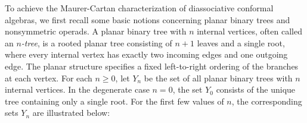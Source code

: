 \documentclass[a4paper,reqno,10pt]{amsart}
\theoremstyle{plain}
\theoremstyle{definition}
\theoremstyle{remark}
\begin{document}
\medskip

To achieve the Maurer-Cartan characterization of diassociative conformal algebras, we first recall some basic notions concerning planar binary trees and nonsymmetric operads. A planar binary tree with $n$ internal vertices, often called an {\em $n$-tree}, is a rooted planar tree consisting of $n+1$ leaves and a single root, where every internal vertex has exactly two incoming edges and one outgoing edge. The planar structure specifies a fixed left-to-right ordering of the branches at each vertex. For each $n \geq 0$, let $Y_{n}$ be the set of all planar binary trees with $n$ internal vertices. In the degenerate case $n=0$, the set $Y_{0}$ consists of the unique tree containing only a single root. For the first few values of $n$, the corresponding sets $Y_{n}$ are illustrated below:

\medskip
\end{document}
